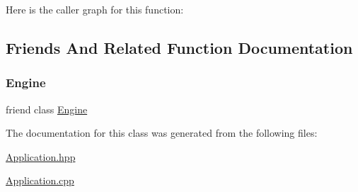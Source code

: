Here is the caller graph for this function\+:


\subsection{Friends And Related Function Documentation}
\mbox{\label{class_saturn_1_1_application_a3e1914489e4bed4f9f23cdeab34a43dc}} 
\subsubsection{\texorpdfstring{Engine}{Engine}}
{\footnotesize\ttfamily friend class \mbox{\hyperlink{class_saturn_1_1_engine}{Engine}}\hspace{0.3cm}{\ttfamily [friend]}}



The documentation for this class was generated from the following files\+:\begin{DoxyCompactItemize}
\item 
\mbox{\hyperlink{_application_8hpp}{Application.\+hpp}}\item 
\mbox{\hyperlink{_application_8cpp}{Application.\+cpp}}\end{DoxyCompactItemize}
